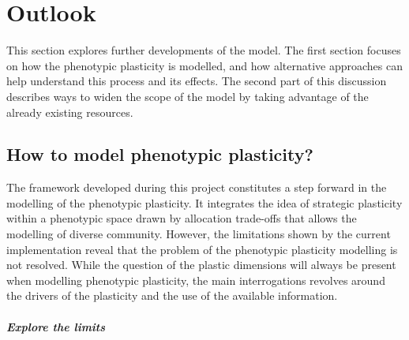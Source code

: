 

\chapter{Outlook}

This section explores further developments of the model. The first section focuses on how the phenotypic plasticity is modelled, and how alternative approaches can help understand this process and its effects. The second part of this discussion describes ways to widen the scope of the model by taking advantage of the already existing resources.

\section{How to model phenotypic plasticity? }

The framework developed during this project constitutes a step forward in the modelling of the phenotypic plasticity. It integrates the idea of strategic plasticity \parencite{bradshaw_evolutionary_1965, dewitt_expanding_2016} within a phenotypic space drawn by allocation trade-offs that allows the modelling of diverse community. However, the limitations shown by the current implementation reveal that the problem of the phenotypic plasticity modelling is not resolved. While the question of the plastic dimensions will always be present when modelling phenotypic plasticity, the main interrogations revolves around the drivers of the plasticity and the use of the available information. 


\paragraph{Explore the limits}

